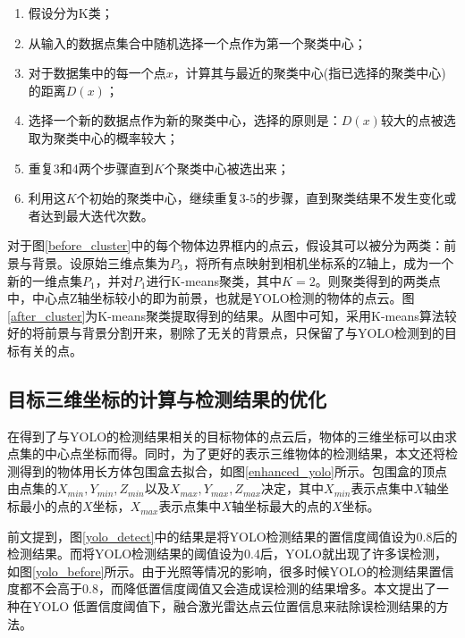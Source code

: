 \begin{enumerate}
    \item 假设分为K类；
    \item 从输入的数据点集合中随机选择一个点作为第一个聚类中心；
    \item 对于数据集中的每一个点$x$，计算其与最近的聚类中心(指已选择的聚类中心)的距离$D(x)$；
    \item 选择一个新的数据点作为新的聚类中心，选择的原则是：$D(x)$较大的点被选取为聚类中心的概率较大；
    \item 重复3和4两个步骤直到$K$个聚类中心被选出来；
    \item 利用这$K$个初始的聚类中心，继续重复3-5的步骤，直到聚类结果不发生变化或者达到最大迭代次数。
\end{enumerate}

对于图\ref{before_cluster}中的每个物体边界框内的点云，假设其可以被分为两类：前景与背景。设原始三维点集为$P_3$，将所有点映射到相机坐标系的Z轴上，成为一个新的一维点集$P_1$，并对$P_1$进行K-means聚类，其中$K=2$。则聚类得到的两类点中，中心点Z轴坐标较小的即为前景，也就是YOLO检测的物体的点云。图\ref{after_cluster}为K-means聚类提取得到的结果。从图中可知，采用K-means算法较好的将前景与背景分割开来，剔除了无关的背景点，只保留了与YOLO检测到的目标有关的点。

\subsection{目标三维坐标的计算与检测结果的优化}

在得到了与YOLO的检测结果相关的目标物体的点云后，物体的三维坐标可以由求点集的中心点坐标而得。同时，为了更好的表示三维物体的检测结果，本文还将检测得到的物体用长方体包围盒去拟合，如图\ref{enhanced_yolo}所示。包围盒的顶点由点集的$X_{min}, Y_{min}, Z_{min}$以及$X_{max}, Y_{max}, Z_{max}$决定，其中$X_{min}$表示点集中$X$轴坐标最小的点的$X$坐标，$X_{max}$表示点集中$X$轴坐标最大的点的$X$坐标。


前文提到，图\ref{yolo_detect}中的结果是将YOLO检测结果的置信度阈值设为0.8后的检测结果。而将YOLO检测结果的阈值设为0.4后，YOLO就出现了许多误检测，如图\ref{yolo_before}所示。由于光照等情况的影响，很多时候YOLO的检测结果置信度都不会高于0.8，而降低置信度阈值又会造成误检测的结果增多。本文提出了一种在YOLO 低置信度阈值下，融合激光雷达点云位置信息来祛除误检测结果的方法。

